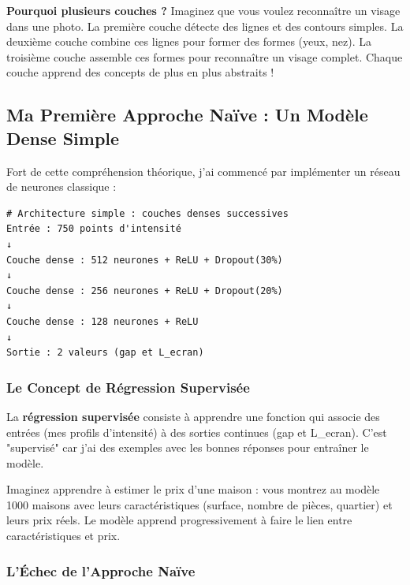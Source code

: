 \documentclass[11pt,a4paper]{article}
\begin{document}
\begin{warningbox}
\textbf{Pourquoi plusieurs couches ?} Imaginez que vous voulez reconnaître un visage dans une photo. La première couche détecte des lignes et des contours simples. La deuxième couche combine ces lignes pour former des formes (yeux, nez). La troisième couche assemble ces formes pour reconnaître un visage complet. Chaque couche apprend des concepts de plus en plus abstraits !
\end{warningbox}

\subsection{Ma Première Approche Naïve : Un Modèle Dense Simple}

Fort de cette compréhension théorique, j'ai commencé par implémenter un réseau de neurones classique :

\begin{lstlisting}[caption=Mon premier modèle naïf]
# Architecture simple : couches denses successives
Entrée : 750 points d'intensité
↓
Couche dense : 512 neurones + ReLU + Dropout(30%)
↓
Couche dense : 256 neurones + ReLU + Dropout(20%)
↓
Couche dense : 128 neurones + ReLU
↓
Sortie : 2 valeurs (gap et L_ecran)
\end{lstlisting}

\subsubsection{Le Concept de Régression Supervisée}

\begin{definitionbox}
La \textbf{régression supervisée} consiste à apprendre une fonction qui associe des entrées (mes profils d'intensité) à des sorties continues (gap et L\_ecran). C'est "supervisé" car j'ai des exemples avec les bonnes réponses pour entraîner le modèle.

Imaginez apprendre à estimer le prix d'une maison : vous montrez au modèle 1000 maisons avec leurs caractéristiques (surface, nombre de pièces, quartier) et leurs prix réels. Le modèle apprend progressivement à faire le lien entre caractéristiques et prix.
\end{definitionbox}

\subsubsection{L'Échec de l'Approche Naïve}
\end{document}
